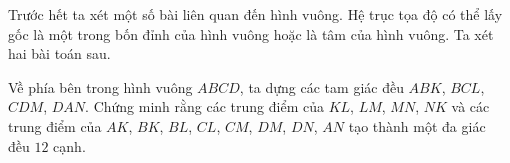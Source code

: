 \noindent Trước hết ta xét một số bài liên quan đến hình vuông. Hệ trục tọa độ có thể lấy gốc là một trong bốn đỉnh của hình vuông hoặc là tâm của hình vuông. Ta xét hai bài toán sau.
\begin{bt}[Iran, 2001]%
	Về phía bên trong hình vuông $ABCD$, ta dựng các tam giác đều $ABK$, $BCL$, $CDM$, $DAN$. Chứng minh rằng các trung điểm của $KL$, $LM$, $MN$, $NK$ và các trung điểm của $AK$, $BK$, $BL$, $CL$, $CM$, $DM$, $DN$, $AN$ tạo thành một đa giác đều $12$ cạnh.
\end{bt}
